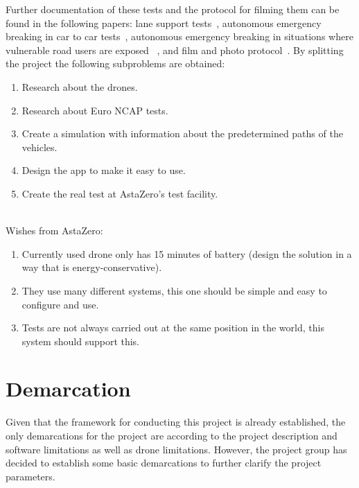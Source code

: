  Further documentation of these tests and the protocol for filming them can be found in the following papers: lane support tests~\cite{EuroNCAP2022EUROPEAN2023b}, autonomous emergency breaking in car to car tests~\cite{EuroNCAP2022EUROPEAN2023}, autonomous emergency breaking in situations where vulnerable road users are exposed ~\cite{EuroNCAP2022EUROPEANNCAPb}, and film and photo protocol~\cite{EuroNCAP2021EUROPEANPROTOCOL}. By splitting the project the following subproblems are obtained: 
\newline
    \begin{enumerate}
        \item Research about the drones.
        \item Research about Euro NCAP tests.
        \item Create a simulation with information about the predetermined paths of the vehicles.
        \item Design the app to make it easy to use.
        \item Create the real test at AstaZero's test facility.
    \end{enumerate}
\\


Wishes from AstaZero:
\newline
    \begin{enumerate}
        \item Currently used drone only has 15 minutes of battery (design the solution in a way that is energy-conservative).
        \item They use many different systems, this one should be simple and easy to configure and use.
        \item Tests are not always carried out at the same position in the world, this system should support this.
    \end{enumerate}


\section{Demarcation} \label{chap:demarcation}
Given that the framework for conducting this project is already established, the only demarcations for the project are according to the project description and software limitations as well as drone limitations. However, the project group has decided to establish some basic demarcations to further clarify the project parameters. 

